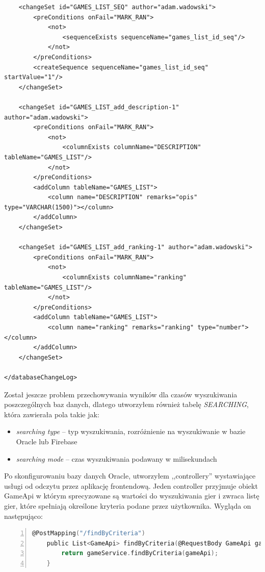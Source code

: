 \begin{lstlisting}
    <changeSet id="GAMES_LIST_SEQ" author="adam.wadowski">
        <preConditions onFail="MARK_RAN">
            <not>
                <sequenceExists sequenceName="games_list_id_seq"/>
            </not>
        </preConditions>
        <createSequence sequenceName="games_list_id_seq" startValue="1"/>
    </changeSet>

    <changeSet id="GAMES_LIST_add_description-1" author="adam.wadowski">
        <preConditions onFail="MARK_RAN">
            <not>
                <columnExists columnName="DESCRIPTION" tableName="GAMES_LIST"/>
            </not>
        </preConditions>
        <addColumn tableName="GAMES_LIST">
            <column name="DESCRIPTION" remarks="opis" type="VARCHAR(1500)"></column>
        </addColumn>
    </changeSet>

    <changeSet id="GAMES_LIST_add_ranking-1" author="adam.wadowski">
        <preConditions onFail="MARK_RAN">
            <not>
                <columnExists columnName="ranking" tableName="GAMES_LIST"/>
            </not>
        </preConditions>
        <addColumn tableName="GAMES_LIST">
            <column name="ranking" remarks="ranking" type="number"></column>
        </addColumn>
    </changeSet>

</databaseChangeLog>
\end{lstlisting}

Został jeszcze problem przechowywania wyników dla czasów wyszukiwania poszczególnych baz danych, dlatego utworzyłem również tabelę \textit{SEARCHING}, która zawierała pola takie jak:
\begin{itemize}
\item \textit{searching type} -- typ wyszukiwania, rozróżnienie na wyszukiwanie w bazie Oracle lub Firebase
\item \textit{searching mode} -- czas wyszukiwania podawany w milisekundach
\end{itemize}
Po skonfigurowaniu bazy danych Oracle, utworzyłem ,,controllery'' wystawiające usługi od odczytu przez aplikację frontendową. Jeden controller przyjmuje obiekt GameApi w którym sprecyzowane są wartości do wyszukiwania gier i zwraca listę gier, które spełniają określone kryteria podane przez użytkownika. Wygląda on następująco:
\begin{lstlisting}[language=C, mathescape, frame=single, numbers=left, xleftmargin=2em, framexleftmargin=2em, basicstyle=\ttfamily\bfseries, caption={Kontroler do znajdowania gier}, label={Kontroler do znajdowania gier}]
@PostMapping("/findByCriteria")
    public List<GameApi> findByCriteria(@RequestBody GameApi gameApi) {
        return gameService.findByCriteria(gameApi);
    }
\end{lstlisting}

